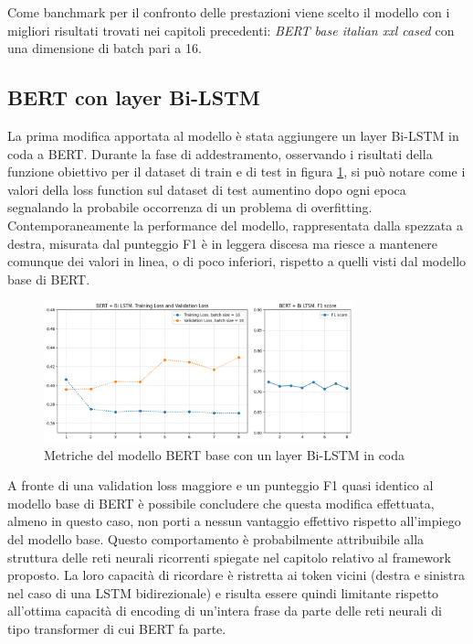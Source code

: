 Come banchmark per il confronto delle prestazioni viene scelto il modello con i migliori risultati trovati nei capitoli precedenti: \textit{BERT base italian xxl cased} con una dimensione di batch pari a 16.

\subsection{BERT con layer Bi-LSTM}
    La prima modifica apportata al modello è stata aggiungere un layer Bi-LSTM in coda a BERT. Durante la fase di addestramento, osservando i risultati della funzione obiettivo per il dataset di train e di test in figura \ref{fig:bert-bi-lstm}, si può notare come i valori della loss function sul dataset di test aumentino dopo ogni epoca segnalando la probabile occorrenza di un problema di overfitting. Contemporaneamente la performance del modello, rappresentata dalla spezzata a destra, misurata dal punteggio F1 è in leggera discesa ma riesce a mantenere comunque dei valori in linea, o di poco inferiori, rispetto a quelli visti dal modello base di BERT.
    
    
    \begin{figure}[h]
        \centering
        \includegraphics[width=0.8\textwidth]{pics/modifiche bert/BERT Bi LSTM.png}
        \caption{Metriche del modello BERT base con un layer Bi-LSTM in coda}
        \label{fig:bert-bi-lstm}
    \end{figure}
    
    
    A fronte di una validation loss maggiore e un punteggio F1 quasi identico al modello base di BERT è possibile concludere che questa modifica effettuata, almeno in questo caso, non porti a nessun vantaggio effettivo rispetto all'impiego del modello base. Questo comportamento è probabilmente attribuibile alla struttura delle reti neurali ricorrenti spiegate nel capitolo relativo al framework proposto. La loro capacità di ricordare è ristretta ai token vicini (destra e sinistra nel caso di una LSTM bidirezionale) e risulta essere quindi limitante rispetto all'ottima capacità di encoding di un'intera frase da parte delle reti neurali di tipo transformer di cui BERT fa parte.

